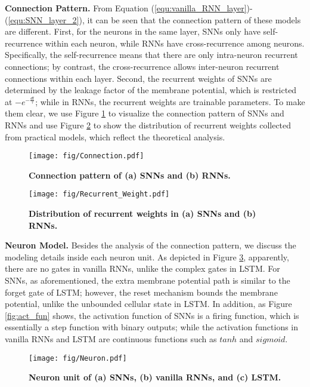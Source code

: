 \documentclass[journal,10pt,twocolumn]{IEEETran}
\begin{document}
\textbf{Connection Pattern.} From Equation (\ref{equ:vanilla_RNN_layer})-(\ref{equ:SNN_layer_2}), it can be seen that the connection pattern of these models are different. First, for the neurons in the same layer, SNNs only have self-recurrence within each neuron, while RNNs have cross-recurrence among neurons. Specifically, the self-recurrence means that there are only intra-neuron recurrent connections; by contrast, the cross-recurrence allows inter-neuron recurrent connections within each layer. Second, the recurrent weights of SNNs are determined by the leakage factor of the membrane potential, which is restricted at $-e^{-\frac{dt}{\tau}}$; while in RNNs, the recurrent weights are trainable parameters. To make them clear, we use Figure \ref{fig:connection} to visualize the connection pattern of SNNs and RNNs and use Figure \ref{fig:recurrent_weight} to show the distribution of recurrent weights collected from practical models, which reflect the theoretical analysis.

\begin{figure}[!htbp]
\centering     
\texttt{[image: fig/Connection.pdf]}
\flushleft
\caption{\textbf{Connection pattern of (a) SNNs and (b) RNNs.}} \label{fig:connection} 
\end{figure}

\begin{figure}[!htbp]
\centering     
\texttt{[image: fig/Recurrent\_Weight.pdf]}
\flushleft
\caption{\textbf{Distribution of recurrent weights in (a) SNNs and (b) RNNs.}} \label{fig:recurrent_weight}
\end{figure}

\textbf{Neuron Model.} Besides the analysis of the connection pattern, we discuss the modeling details inside each neuron unit. As depicted in Figure \ref{fig:neuron}, apparently, there are no gates in vanilla RNNs, unlike the complex gates in LSTM. For SNNs, as aforementioned, the extra membrane potential path is similar to the forget gate of LSTM; however, the reset mechanism bounds the membrane potential, unlike the unbounded cellular state in LSTM. In addition, as Figure \ref{fig:act_fun} shows, the activation function of SNNs is a firing function, which is essentially a step function with binary outputs; while the activation functions in vanilla RNNs and LSTM are continuous functions such as $tanh$ and $sigmoid$.  

\begin{figure}[!htbp]
\centering     
\texttt{[image: fig/Neuron.pdf]}
\flushleft
\caption{\textbf{Neuron unit of (a) SNNs, (b) vanilla RNNs, and (c) LSTM.}} \label{fig:neuron} 
\end{figure}
\end{document}
